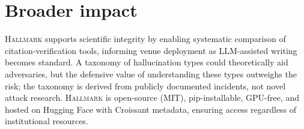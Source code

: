 \section{Broader impact}
\label{sec:broader_impact}

\textsc{Hallmark} supports scientific integrity by enabling systematic comparison of citation-verification tools, informing venue deployment as LLM-assisted writing becomes standard.
A taxonomy of hallucination types could theoretically aid adversaries, but the defensive value of understanding these types outweighs the risk; the taxonomy is derived from publicly documented incidents, not novel attack research.
\textsc{Hallmark} is open-source (MIT), pip-installable, GPU-free, and hosted on Hugging Face with Croissant metadata, ensuring access regardless of institutional resources.
